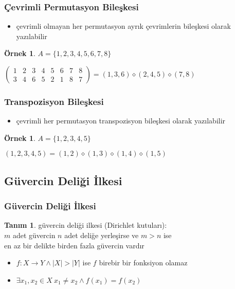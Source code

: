 \documentclass[dvipsnames]{beamer}
\theoremstyle{definition}
\newtheorem{tanim}[theorem]{Tanım}
\theoremstyle{example}
\newtheorem{ornek}[theorem]{Örnek}
\theoremstyle{plain}
\begin{document}
\begin{frame}
  \frametitle{Çevrimli Permutasyon Bileşkesi}

  \begin{itemize}
    \item çevrimli olmayan her permutasyon ayrık çevrimlerin bileşkesi olarak
      yazılabilir
  \end{itemize}

  \pause
  \begin{ornek}
    $A = \{1,2,3,4,5,6,7,8\}$

    \medskip
    $\left(
      \begin{array}{cccccccc}
        1 & 2 & 3 & 4 & 5 & 6 & 7 & 8\\
        3 & 4 & 6 & 5 & 2 & 1 & 8 & 7
      \end{array}
    \right) = (1,3,6) \diamond (2,4,5) \diamond (7,8)$
  \end{ornek}
\end{frame}

\begin{frame}
  \frametitle{Transpozisyon Bileşkesi}

  \begin{itemize}
    \item çevrimli her permutasyon transpozisyon bileşkesi olarak yazılabilir
  \end{itemize}

  \pause
  \begin{ornek}
    $A = \{1,2,3,4,5\}$

    \medskip
    $(1,2,3,4,5) = (1,2) \diamond (1,3) \diamond (1,4) \diamond (1,5)$
  \end{ornek}
\end{frame}

\subsection{Güvercin Deliği İlkesi}

\begin{frame}
  \frametitle{Güvercin Deliği İlkesi}

  \begin{tanim}
    \alert{güvercin deliği ilkesi} (Dirichlet kutuları):\\
    $m$ adet güvercin $n$ adet deliğe yerleşirse ve $m>n$ ise\\
    en az bir delikte birden fazla güvercin vardır
  \end{tanim}

  \pause
  \begin{itemize}
    \item $f: X \rightarrow Y \wedge |X|>|Y|$ ise $f$ birebir bir fonksiyon
      olamaz

    \item $\exists x_1,x_2 \in X~x_1 \neq x_2 \wedge f(x_1)=f(x_2)$
  \end{itemize}
\end{frame}
\end{document}
